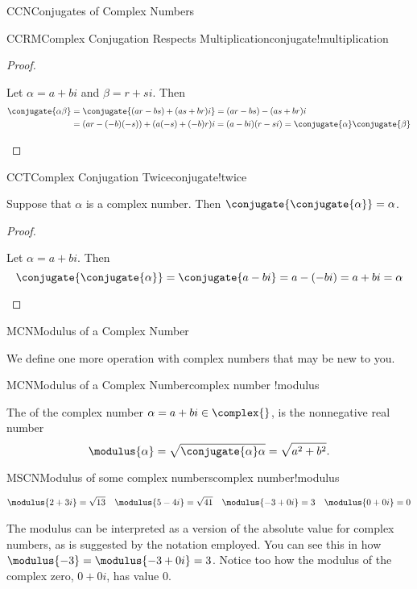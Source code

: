 \begin{subsect}{CCN}{Conjugates of Complex Numbers}
\begin{theorem}{CCRM}{Complex Conjugation Respects Multiplication}{conjugate!multiplication}
\end{theorem}
%
\begin{proof}
\begin{para}Let $\alpha=a+bi$ and $\beta=r+si$.  Then
%
\begin{align*}
\conjugate{\alpha\beta}&=\conjugate{(ar-bs)+(as+br)i}=(ar-bs)-(as+br)i\\
&=(ar-(-b)(-s))+(a(-s)+(-b)r)i=(a-bi)(r-si)=\conjugate{\alpha}\conjugate{\beta}
\end{align*}
\end{para}
%
\end{proof}
%
\begin{theorem}{CCT}{Complex Conjugation Twice}{conjugate!twice}
\begin{para}Suppose that $\alpha$ is a complex number.  Then $\conjugate{\conjugate{\alpha}}=\alpha$.\end{para}
\end{theorem}
%
\begin{proof}
\begin{para}Let $\alpha=a+bi$.  Then
%
\begin{equation*}
\conjugate{\conjugate{\alpha}}=\conjugate{a-bi}=a-(-bi)=a+bi=\alpha
\end{equation*}
\end{para}
%
\end{proof}
%
\end{subsect}
%
\begin{subsect}{MCN}{Modulus of a Complex Number}
%
\begin{para}We define one more operation with complex numbers that may be new to you.\end{para}
%
\begin{definition}{MCN}{Modulus of a Complex Number}{complex number !modulus}
\begin{para}The  of the complex number $\alpha=a+bi\in\complex{\null}$, is the nonnegative real number
%
\begin{equation*}
\modulus{\alpha}=\sqrt{\conjugate{\alpha}\alpha}=\sqrt{a^2+b^2}.
\end{equation*}
\end{para}
%
\end{definition}
%
\begin{example}{MSCN}{Modulus of some complex numbers}{complex number!modulus}
%
\begin{para}\begin{align*}
\modulus{2+3i}=\sqrt{13}&&\modulus{5-4i}=\sqrt{41}&&
\modulus{-3+0i}=3&&\modulus{0+0i}=0
\end{align*}
\end{para}
%
\end{example}
%
\begin{para}The modulus can be interpreted as a version of the absolute value for complex numbers, as is suggested by the notation employed.  You can see this in how $\modulus{-3}=\modulus{-3+0i}=3$.  Notice too how the modulus of the complex zero, $0+0i$, has value $0$.\end{para}
%
\end{subsect}
%

